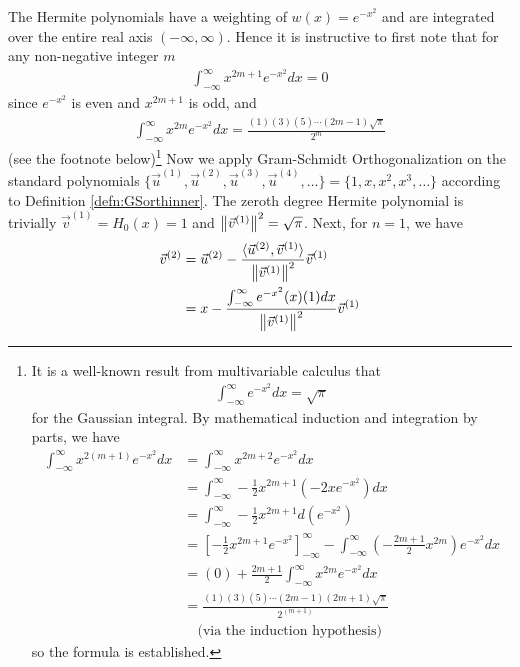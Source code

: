 \begin{solution}
The Hermite polynomials have a weighting of $w(x) = e^{-x^2}$ and are integrated over the entire real axis $(-\infty, \infty)$. Hence it is instructive to first note that for any non-negative integer $m$
\begin{align*}
\int_{-\infty}^{\infty} x^{2m+1}e^{-x^2} dx = 0
\end{align*}
since $e^{-x^2}$ is even and $x^{2m+1}$ is odd, and
\begin{align*}
\int_{-\infty}^{\infty} x^{2m}e^{-x^2} dx = \frac{(1)(3)(5)\cdots(2m-1)\sqrt{\pi}}{2^m}
\end{align*}
(see the footnote below)\footnote{It is a well-known result from multivariable calculus that
\begin{align*}
\int_{-\infty}^{\infty} e^{-x^2} dx = \sqrt{\pi}
\end{align*}
for the Gaussian integral. By mathematical induction and integration by parts, we have
\begin{align*}
\int_{-\infty}^{\infty} x^{2(m+1)}e^{-x^2} dx &= \int_{-\infty}^{\infty} x^{2m+2}e^{-x^2} dx \\
&= \int_{-\infty}^{\infty} -\frac{1}{2}x^{2m+1} (-2xe^{-x^2}) dx \\
&= \int_{-\infty}^{\infty} -\frac{1}{2}x^{2m+1} d(e^{-x^2}) \\
&= [-\frac{1}{2}x^{2m+1}e^{-x^2}]_{-\infty}^{\infty} - \int_{-\infty}^{\infty} (-\frac{2m+1}{2}x^{2m})e^{-x^2} dx \\
&= (0) + \frac{2m+1}{2} \int_{-\infty}^{\infty} x^{2m}e^{-x^2} dx \\
&= \frac{(1)(3)(5)\cdots(2m-1)(2m+1)\sqrt{\pi}}{2^{(m+1)}} \\
&\quad \text{(via the induction hypothesis)}
\end{align*}
so the formula is established.}
Now we apply Gram-Schmidt Orthogonalization on the standard polynomials $\{\vec{u}^{(1)}, \vec{u}^{(2)}, \vec{u}^{(3)}, \vec{u}^{(4)}, \ldots\} = \{1, x, x^2, x^3, \ldots\}$ according to Definition \ref{defn:GSorthinner}. The zeroth degree Hermite polynomial is trivially $\vec{v}^{(1)} = H_0(x) = 1$ and $\norm{\vec{v}^{(1)}}^2 = \sqrt{\pi}$. Next, for $n=1$, we have
\begin{align*}
\vec{v}^{(2)} &= \vec{u}^{(2)} - \frac{\langle \vec{u}^{(2)}, \vec{v}^{(1)}\rangle}{\norm{\vec{v}^{(1)}}^2} \vec{v}^{(1)} \\
&= x - \frac{\int_{-\infty}^{\infty} e^{-x^2}(x)(1) dx}{\norm{\vec{v}^{(1)}}^2} \vec{v}^{(1)} \\

\end{align*}
\end{solution}
